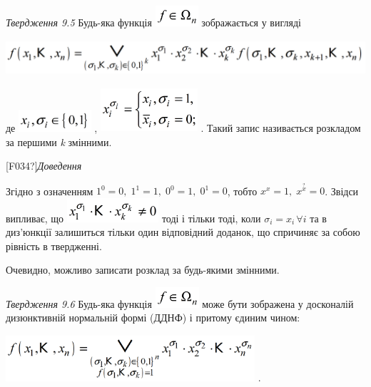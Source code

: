 \documentclass[a4paper]{article}
\newcounter{}
\begin{document}
\textit{Твердження 9.5 }\textit{ }Будь-яка функція 
\includegraphics[width=0.6244in,height=0.3016in]{crypt-img/crypt-img106.png} 
зображається у вигляді

{\centering
  \includegraphics[width=5.7354in,height=0.5189in]{crypt-img/crypt-img107.png} 
\par}

де  \includegraphics[width=1.0583in,height=0.3307in]{crypt-img/crypt-img108.png}
,  \includegraphics[width=1.4165in,height=0.6354in]{crypt-img/crypt-img109.png}
. Такий запис називається  розкладом за першими \textit{k}\textit{ }змінними.

\textlatin{[F034?]}\textit{Доведення} 

Згідно з означенням   ${1^{{0}}=0,\;1^{{1}}=1,\;0^{{0}}=1,\;0^{{1}}=0}$, тобто 
${x^{{x}}=1,\;x^{{\overset{{?}}{{x}}}}=0}$. Звідси випливає, що 
\includegraphics[width=1.339in,height=0.35in]{crypt-img/crypt-img110.png}  тоді
і тільки тоді, коли  ${\sigma _{{i}}=x_{{i\ }}\forall i}$ та в диз’юнкції
залишиться тільки один відповідний доданок, що спричиняє  за собою  рівність в
твердженні.

Очевидно, можливо записати розклад за будь-якими змінними.

\textit{Твердження 9.6}\textbf{  }Будь-яка функція 
\includegraphics[width=0.6354in,height=0.3016in]{crypt-img/crypt-img111.png} 
може бути зображена у досконалій диз{\textquotesingle}юнктивній нормальній
формі (ДДНФ) і притому єдиним чином:

{\centering
 \includegraphics[width=3.6366in,height=0.6807in]{crypt-img/crypt-img112.png} .
\par}
\end{document}
